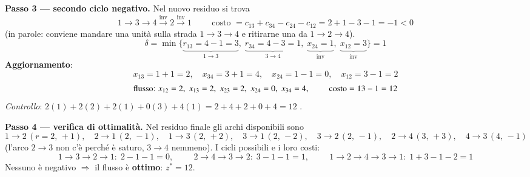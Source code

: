 \documentclass[12pt]{extarticle} %
\begin{document}
\noindent\textbf{Passo 3 --- secondo ciclo negativo.} Nel nuovo residuo si trova
\[
1 \to 3 \to 4 \xrightarrow{\text{inv}} 2 \xrightarrow{\text{inv}} 1 \hspace{1cm}\text{costo } = c_{13} + c_{34} - c_{24} - c_{12} = 2 + 1 - 3 - 1 = -1 < 0
\]
(in parole: conviene mandare una unità sulla strada $1\to3\to4$ e ritirarne una da $1\to2\to4$).
\[
\delta = \min\{\underbrace{r_{13} = 4-1 = 3}_{1\to3},\; \underbrace{r_{34} = 4-3 = 1}_{3\to4},\; \underbrace{x_{24} = 1}_{\text{inv}},\; \underbrace{x_{12} = 3}_{\text{inv}}\} = 1
\]
\textbf{Aggiornamento}:
\[
x_{13} = 1+1 = 2, \quad x_{34} = 3+1 = 4, \quad x_{24} = 1-1 = 0, \quad x_{12} = 3-1 = 2
\]
\[
\text{flusso: } x_{12}=2,\; x_{13}=2,\; x_{23}=2,\; x_{24}=0,\; x_{34}=4, \hspace{0.8cm} \text{costo} = 13 - 1 = 12
\]
\textit{Controllo}: $2(1) + 2(2) + 2(1) + 0(3) + 4(1) = 2+4+2+0+4 = 12$ \checkmark.
\begin{center}
\end{center}


\noindent\textbf{Passo 4 --- verifica di ottimalità.} Nel residuo finale gli archi disponibili sono
\[
1\to2\,(r{=}2,\,{+}1), \quad 2\to1\,(2,\,{-}1), \quad 1\to3\,(2,\,{+}2), \quad 3\to1\,(2,\,{-}2), \quad 3\to2\,(2,\,{-}1), \quad 2\to4\,(3,\,{+}3), \quad 4\to3\,(4,\,{-}1)
\]
(l'arco $2\to3$ non c'è perché è saturo, $3\to4$ nemmeno). I cicli possibili e i loro costi:
\[
1\to3\to2\to1:\; 2 - 1 - 1 = 0, \hspace{1cm}
2\to4\to3\to2:\; 3 - 1 - 1 = 1, \hspace{1cm}
1\to2\to4\to3\to1:\; 1 + 3 - 1 - 2 = 1
\]
Nessuno è negativo $\Rightarrow$ il flusso è \textbf{ottimo}: $z^* = 12$.
\end{document}
